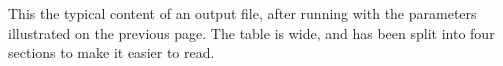 %
%
%
%
\label{app-output}
This the typical content of an output file, after running \duchamp
with the parameters illustrated on the previous page. The table is
wide, and has been split into four sections to make it easier to read.
